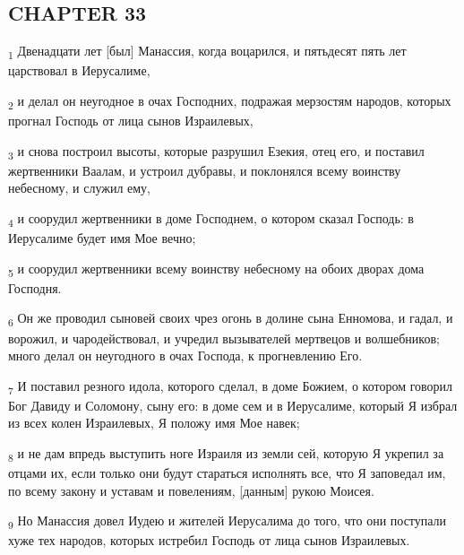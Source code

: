 \subsection{CHAPTER 33}
\begin{tcolorbox}
\textsubscript{1} Двенадцати лет [был] Манассия, когда воцарился, и пятьдесят пять лет царствовал в Иерусалиме,
\end{tcolorbox}
\begin{tcolorbox}
\textsubscript{2} и делал он неугодное в очах Господних, подражая мерзостям народов, которых прогнал Господь от лица сынов Израилевых,
\end{tcolorbox}
\begin{tcolorbox}
\textsubscript{3} и снова построил высоты, которые разрушил Езекия, отец его, и поставил жертвенники Ваалам, и устроил дубравы, и поклонялся всему воинству небесному, и служил ему,
\end{tcolorbox}
\begin{tcolorbox}
\textsubscript{4} и соорудил жертвенники в доме Господнем, о котором сказал Господь: в Иерусалиме будет имя Мое вечно;
\end{tcolorbox}
\begin{tcolorbox}
\textsubscript{5} и соорудил жертвенники всему воинству небесному на обоих дворах дома Господня.
\end{tcolorbox}
\begin{tcolorbox}
\textsubscript{6} Он же проводил сыновей своих чрез огонь в долине сына Енномова, и гадал, и ворожил, и чародействовал, и учредил вызывателей мертвецов и волшебников; много делал он неугодного в очах Господа, к прогневлению Его.
\end{tcolorbox}
\begin{tcolorbox}
\textsubscript{7} И поставил резного идола, которого сделал, в доме Божием, о котором говорил Бог Давиду и Соломону, сыну его: в доме сем и в Иерусалиме, который Я избрал из всех колен Израилевых, Я положу имя Мое навек;
\end{tcolorbox}
\begin{tcolorbox}
\textsubscript{8} и не дам впредь выступить ноге Израиля из земли сей, которую Я укрепил за отцами их, если только они будут стараться исполнять все, что Я заповедал им, по всему закону и уставам и повелениям, [данным] рукою Моисея.
\end{tcolorbox}
\begin{tcolorbox}
\textsubscript{9} Но Манассия довел Иудею и жителей Иерусалима до того, что они поступали хуже тех народов, которых истребил Господь от лица сынов Израилевых.
\end{tcolorbox}
